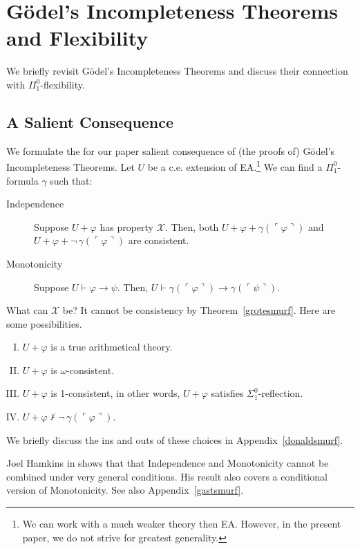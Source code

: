 \documentclass{amsart}
\renewcommand{\phi}{\varphi}
\newcommand{\gnum}[1]{{\ulcorner #1 \urcorner}}
\newcommand{\mc}[1]{\mathcal #1}
\begin{document}
  \section{G\"odel's Incompleteness Theorems and Flexibility}
  We briefly revisit G\"odel's Incompleteness Theorems and discuss their connection with $\Pi^0_1$-flexibility.  
  
  
  \subsection{A Salient Consequence}\label{g-smurf}
  We formulate the for our paper  salient consequence of (the proofs of) G\"odel's Incompleteness Theorems.
  Let $U$ be a c.e. extension of {\sf EA}.\footnote{We can work with a much weaker theory then {\sf EA}. However, in the present paper,
  we do not strive for greatest generality.}
  We can find a $\Pi^0_1$-formula $\gamma$ such that:
  \begin{description}
  \item[Independence]
  Suppose $U+\phi$ has property $\mc X$. Then, both $U+\phi+\gamma(\gnum \phi)$ and $U+\phi+\neg\,\gamma(\gnum \phi)$
  are consistent.
  \item[Monotonicity]
  Suppose $U \vdash \phi \to \psi$. Then, $U \vdash \gamma(\gnum\phi) \to \gamma(\gnum \psi)$.
  \end{description}
  
  \noindent
  What can $\mc X$ be? It cannot be consistency by Theorem~\ref{grotesmurf}. Here are some possibilities.
  \begin{enumerate}[I.]
  \item
  $U+\phi$ is a true arithmetical theory.
  \item
  $U+\phi$ is $\omega$-consistent.
  \item
  $U+\phi$ is 1-consistent, in other words, $U+\phi$ satisfies $\Sigma^0_1$-reflection.
  \item
  $U+\phi \nvdash \neg\, \gamma(\gnum\phi)$.
  \end{enumerate}
  
  \noindent 
  We briefly discuss the ins and outs of these choices in Appendix~\ref{donaldsmurf}.
  
  Joel Hamkins in \cite{hamk:nonl22} shows that that Independence and Monotonicity cannot
  be combined under very general conditions. His result also covers a conditional version
  of Monotonicity. See also Appendix~\ref{gastsmurf}.
  
  
    
\end{document}

